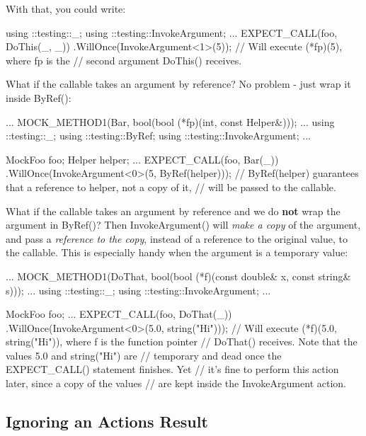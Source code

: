 With that, you could write\+:


\begin{DoxyCode}
using ::testing::\_;
using ::testing::InvokeArgument;
...
  EXPECT\_CALL(foo, DoThis(\_, \_))
      .WillOnce(InvokeArgument<1>(5));
  // Will execute (*fp)(5), where fp is the
  // second argument DoThis() receives.
\end{DoxyCode}


What if the callable takes an argument by reference? No problem -\/ just wrap it inside {\ttfamily By\+Ref()}\+:


\begin{DoxyCode}
...
  MOCK\_METHOD1(Bar, bool(bool (*fp)(int, const Helper&)));
...
using ::testing::\_;
using ::testing::ByRef;
using ::testing::InvokeArgument;
...

  MockFoo foo;
  Helper helper;
  ...
  EXPECT\_CALL(foo, Bar(\_))
      .WillOnce(InvokeArgument<0>(5, ByRef(helper)));
  // ByRef(helper) guarantees that a reference to helper, not a copy of it,
  // will be passed to the callable.
\end{DoxyCode}


What if the callable takes an argument by reference and we do {\bfseries not} wrap the argument in {\ttfamily By\+Ref()}? Then {\ttfamily Invoke\+Argument()} will {\itshape make a copy} of the argument, and pass a {\itshape reference to the copy}, instead of a reference to the original value, to the callable. This is especially handy when the argument is a temporary value\+:


\begin{DoxyCode}
...
  MOCK\_METHOD1(DoThat, bool(bool (*f)(const double& x, const string& s)));
...
using ::testing::\_;
using ::testing::InvokeArgument;
...

  MockFoo foo;
  ...
  EXPECT\_CALL(foo, DoThat(\_))
      .WillOnce(InvokeArgument<0>(5.0, string("Hi")));
  // Will execute (*f)(5.0, string("Hi")), where f is the function pointer
  // DoThat() receives.  Note that the values 5.0 and string("Hi") are
  // temporary and dead once the EXPECT\_CALL() statement finishes.  Yet
  // it's fine to perform this action later, since a copy of the values
  // are kept inside the InvokeArgument action.
\end{DoxyCode}


\subsection*{Ignoring an Action\textquotesingle{}s Result}

